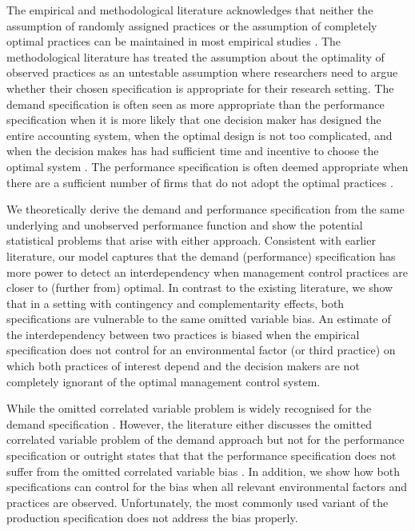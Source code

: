 \documentclass[12pt]{article}
\begin{document}
The empirical and methodological literature acknowledges that neither the assumption of randomly assigned practices or the assumption of completely optimal practices can be maintained in most empirical studies \citep{Brynjolfsson2013ComplementarityOrganizations}. The methodological literature has treated the assumption about the optimality of observed practices as an untestable assumption where researchers need to argue whether their chosen specification is appropriate for their research setting. The demand specification is often seen as more appropriate than the performance specification when it is more likely that one decision maker has designed the entire accounting system, when the optimal design is not too complicated, and when the decision makes has had sufficient time and incentive to choose the optimal system \citep{Grabner2013, Hofmann2015OrganizationalChoices, Carree2011, Johansson2018}.  The performance specification is often deemed appropriate when there are a sufficient number of firms that do not adopt the optimal practices \citep{Carree2011, Bedford2016}. 

We theoretically derive the demand and performance specification from the same underlying and unobserved performance function and show the potential statistical problems that arise with either approach. Consistent with earlier literature, our model captures that the demand (performance) specification has more power to detect an interdependency when management control practices are closer to (further from) optimal. In contrast to the existing literature, we show that in a setting with contingency and complementarity effects, both specifications are vulnerable to the same omitted variable bias. An estimate of the interdependency between two practices is biased when the empirical specification does not control for an environmental factor (or third practice) on which both practices of interest depend and the decision makers are not completely ignorant of the optimal management control system. 

 While the omitted correlated variable problem is widely recognised for the demand specification \citep{Grabner2013, Arora1996,Hofmann2015OrganizationalChoices}. However, the literature either discusses the omitted correlated variable problem of the demand approach but not for the performance specification \citep{Grabner2013,Hofmann2015OrganizationalChoices} or outright states that that the performance specification does not suffer from the omitted correlated variable bias \citep{Carree2011}.  In addition, we show how both specifications can control for the bias when all relevant environmental factors and practices are observed. Unfortunately, the most commonly used variant of the production specification does not address the bias properly.
\end{document}
